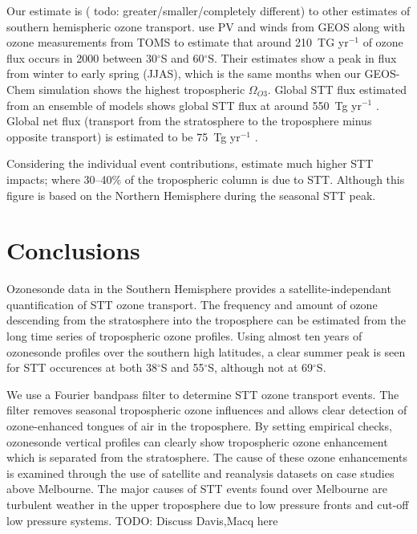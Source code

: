 \documentclass{article}
\begin{document}
  Our estimate is ( todo: greater/smaller/completely different) to other estimates of southern hemispheric ozone transport. 
  \citet{Olsen2003} use PV and winds from GEOS along with ozone measurements from TOMS to estimate that around 210~TG yr$^{-1}$ of ozone flux occurs in 2000 between 30$^{\circ}$S and 60$^{\circ}$S.
  Their estimates show a peak in flux from winter to early spring (JJAS), which is the same months when our GEOS-Chem simulation shows the highest tropospheric $\Omega_{O3}$.
  Global STT flux estimated from an ensemble of models shows global STT flux at around 550~Tg yr$^{-1}$ \citep{Stevenson2006}.
  Global net flux (transport from the stratosphere to the troposphere minus opposite transport) is estimated to be 75~Tg yr$^{-1}$ \citep{Sprenger2003}.
  
  Considering the individual event contributions, \citet{Terao2008} estimate much higher STT impacts; where 30--40\% of the tropospheric column is due to STT. 
  Although this figure is based on the Northern Hemisphere during the seasonal STT peak.
  
  
\section{Conclusions}
  
  Ozonesonde data in the Southern Hemisphere provides a satellite-independant quantification of STT ozone transport.
  The frequency and amount of ozone descending from the stratosphere into the troposphere can be estimated from the long time series of tropospheric ozone profiles.
  Using almost ten years of ozonesonde profiles over the southern high latitudes, a clear summer peak is seen for STT occurences at both 38$^{\circ}$S and 55$^{\circ}$S, although not at 69$^{\circ}$S.
  
  We use a Fourier bandpass filter to determine STT ozone transport events.
  The filter removes seasonal tropospheric ozone influences and allows clear detection of ozone-enhanced tongues of air in the troposphere.
  By setting empirical checks, ozonesonde vertical profiles can clearly show tropospheric ozone enhancement which is separated from the stratosphere.
  The cause of these ozone enhancements is examined through the use of satellite and reanalysis datasets on case studies above Melbourne.
  The major causes of STT events found over Melbourne are turbulent weather in the upper troposphere due to low pressure fronts and cut-off low pressure systems.
  TODO: Discuss Davis,Macq here
  
\end{document}
